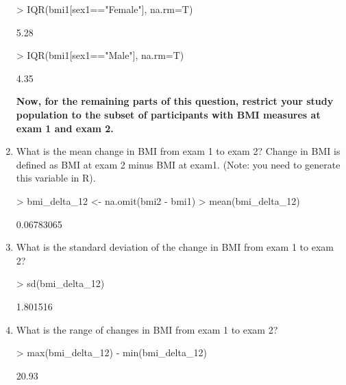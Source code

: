 \documentclass{article}
\begin{document}
\begin{enumerate}
\begin{Schunk}
\begin{Sinput}
> IQR(bmi1[sex1=="Female"], na.rm=T) 
\end{Sinput}
\begin{Soutput}
[1] 5.28
\end{Soutput}
\begin{Sinput}
> IQR(bmi1[sex1=="Male"], na.rm=T)
\end{Sinput}
\begin{Soutput}
[1] 4.35
\end{Soutput}
\end{Schunk}
\pagebreak
\textbf{Now, for the remaining parts of this question, restrict your study population to the subset of participants with BMI measures at exam 1 and exam 2.  }

\item What is the mean change in BMI from exam 1 to exam 2? Change in BMI is defined as BMI at exam 2 minus BMI at exam1. (Note: you need to generate this variable in R).

\begin{Schunk}
\begin{Sinput}
> bmi_delta_12 <- na.omit(bmi2 - bmi1)
> mean(bmi_delta_12)
\end{Sinput}
\begin{Soutput}
[1] 0.06783065
\end{Soutput}
\end{Schunk}

\item What is the standard deviation of the change in BMI from exam 1 to exam 2?

\begin{Schunk}
\begin{Sinput}
> sd(bmi_delta_12)
\end{Sinput}
\begin{Soutput}
[1] 1.801516
\end{Soutput}
\end{Schunk}


\item What is the range of changes in BMI from exam 1 to exam 2?

\begin{Schunk}
\begin{Sinput}
> max(bmi_delta_12) - min(bmi_delta_12)
\end{Sinput}
\begin{Soutput}
[1] 20.93
\end{Soutput}
\end{Schunk}


\end{enumerate}
\end{document}
